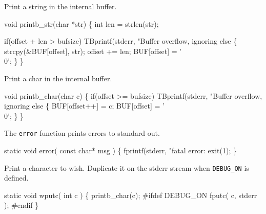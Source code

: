 

Print a string in the internal buffer.

\nwenddocs{}\endmoddef\let\nwnotused=\nwoutput{}
void printb_str(char *str)
\{
  int len = strlen(str);

  if(offset + len > bufsize)
    TBprintf(stderr, "Buffer overflow, ignoring %
  else \{
    strcpy(&BUF[offset], str);
    offset += len;
    BUF[offset] = '\\0';
  \}
\}
\nwendcode{}\nwdocspar

Print a char in the internal buffer.

\nwenddocs{}\endmoddef\let\nwnotused=\nwoutput{}
void printb_char(char c)
\{
  if(offset >= bufsize)
    TBprintf(stderr, "Buffer overflow, ignoring %
  else \{
    BUF[offset++] = c;
    BUF[offset] = '\\0';
  \}
\}
\nwendcode{}\nwdocspar



The {\tt error} function prints errors to standard out.

\nwenddocs{}\endmoddef\let\nwnotused=\nwoutput{}
static void error( const char* msg )
\{
   fprintf(stderr, "fatal error: %
   exit(1);
\}
\nwendcode{}\nwdocspar


Print a character to wish. Duplicate it on
the stderr stream when {\tt DEBUG\_ON} is defined.

\nwenddocs{}\endmoddef\let\nwnotused=\nwoutput{}
static void wputc( int c )
\{
   printb_char(c);
   #ifdef DEBUG_ON
      fputc( c, stderr );
   #endif
\}
\nwendcode{}\nwdocspar

